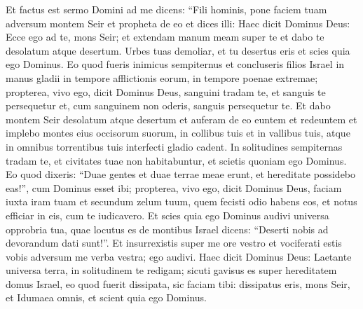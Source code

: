 \begin{biblechapter}  
\verse Et factus est sermo Domini ad me dicens: 
\verse “Fili hominis, pone faciem tuam adversum montem Seir et propheta de eo et dices illi: 
\verse Haec dicit Dominus Deus: Ecce ego ad te, mons Seir; et extendam manum meam super te et dabo te desolatum atque desertum. 
\verse Urbes tuas demoliar, et tu desertus eris et scies quia ego Dominus. 
\verse Eo quod fueris inimicus sempiternus et concluseris filios Israel in manus gladii in tempore afflictionis eorum, in tempore poenae extremae; 
\verse propterea, vivo ego, dicit Dominus Deus, sanguini tradam te, et sanguis te persequetur et, cum sanguinem non oderis, sanguis persequetur te. 
\verse Et dabo montem Seir desolatum atque desertum et auferam de eo euntem et redeuntem 
\verse et implebo montes eius occisorum suorum, in collibus tuis et in vallibus tuis, atque in omnibus torrentibus tuis interfecti gladio cadent. 
\verse In solitudines sempiternas tradam te, et civitates tuae non habitabuntur, et scietis quoniam ego Dominus. 
\verse Eo quod dixeris: “Duae gentes et duae terrae meae erunt, et hereditate possidebo eas!”, cum Dominus esset ibi; 
\verse propterea, vivo ego, dicit Dominus Deus, faciam iuxta iram tuam et secundum zelum tuum, quem fecisti odio habens eos, et notus efficiar in eis, cum te iudicavero. 
\verse Et scies quia ego Dominus audivi universa opprobria tua, quae locutus es de montibus Israel dicens: “Deserti nobis ad devorandum dati sunt!”. 
\verse Et insurrexistis super me ore vestro et vociferati estis vobis adversum me verba vestra; ego audivi. 
\verse Haec dicit Dominus Deus: Laetante universa terra, in solitudinem te redigam; 
\verse sicuti gavisus es super hereditatem domus Israel, eo quod fuerit dissipata, sic faciam tibi: dissipatus eris, mons Seir, et Idumaea omnis, et scient quia ego Dominus. 
\end{biblechapter}

